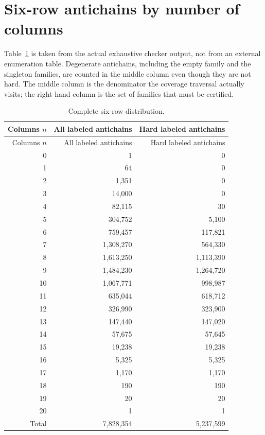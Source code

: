 \documentclass[11pt,letterpaper]{article}
\numberwithin{equation}{section}
\theoremstyle{definition}
\theoremstyle{remark}
\begin{document}
\clearpage
\section{Six-row antichains by number of columns}
\label{app:counts}
Table~\ref{tab:columns} is taken from the actual exhaustive checker output,
not from an external enumeration table. Degenerate antichains, including the
empty family and the singleton families, are counted in the middle column
even though they are not hard. The middle column is the denominator the
coverage traversal actually visits; the right-hand column is the set of
families that must be certified.

\begin{longtable}{rrr}
\caption{Complete six-row distribution.}\label{tab:columns}\\
\toprule
Columns $n$ & All labeled antichains & Hard labeled antichains\\
\midrule
\endfirsthead
\toprule
Columns $n$ & All labeled antichains & Hard labeled antichains\\
\midrule
\endhead
0 & 1 & 0 \\
1 & 64 & 0 \\
2 & 1,351 & 0 \\
3 & 14,000 & 0 \\
4 & 82,115 & 30 \\
5 & 304,752 & 5,100 \\
6 & 759,457 & 117,821 \\
7 & 1,308,270 & 564,330 \\
8 & 1,613,250 & 1,113,390 \\
9 & 1,484,230 & 1,264,720 \\
10 & 1,067,771 & 998,987 \\
11 & 635,044 & 618,712 \\
12 & 326,990 & 323,900 \\
13 & 147,440 & 147,020 \\
14 & 57,675 & 57,645 \\
15 & 19,238 & 19,238 \\
16 & 5,325 & 5,325 \\
17 & 1,170 & 1,170 \\
18 & 190 & 190 \\
19 & 20 & 20 \\
20 & 1 & 1 \\
\midrule
Total & 7,828,354 & 5,237,599\\
\bottomrule
\end{longtable}
\end{document}
